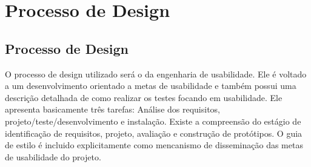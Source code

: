 \part[Processo de Design]{Processo de Design}
\chapter[Processo de Design]{Processo de Design}

O processo de design utilizado será o da engenharia de usabilidade. Ele é voltado a um desenvolvimento orientado a metas de usabilidade e também possui uma descrição detalhada de como realizar os testes focando em usabilidade. Ele apresenta basicamente três tarefas: Análise dos requisitos, projeto/teste/desenvolvimento e instalação. Existe a compreensão do estágio de identificação de requisitos, projeto, avaliação e construção de protótipos. O guia de estilo é incluido explicitamente como mencanismo de disseminação das metas de usabilidade do projeto.

